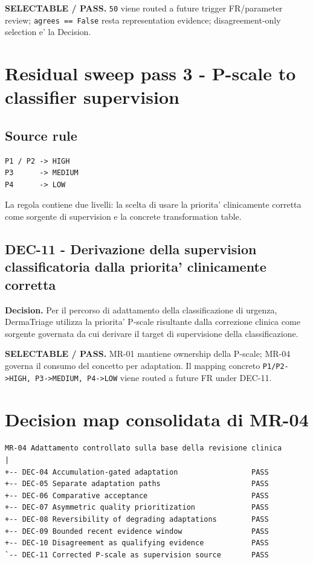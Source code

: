 \documentclass[11pt,a4paper]{article}
\begin{document}
\begin{ddtacore}[title={Disposition}]
\textbf{SELECTABLE / PASS.} \texttt{50} viene routed a future trigger FR/parameter review; \texttt{agrees == False} resta representation evidence; disagreement-only selection e' la Decision.
\end{ddtacore}

\section{Residual sweep pass 3 - P-scale to classifier supervision}
\subsection{Source rule}
\begin{lstlisting}
P1 / P2 -> HIGH
P3      -> MEDIUM
P4      -> LOW
\end{lstlisting}

La regola contiene due livelli: la scelta di usare la priorita' clinicamente corretta come sorgente di supervision e la concrete transformation table.

\subsection{DEC-11 - Derivazione della supervision classificatoria dalla priorita' clinicamente corretta}
\textbf{Decision.} Per il percorso di adattamento della classificazione di urgenza, DermaTriage utilizza la priorita' P-scale risultante dalla correzione clinica come sorgente governata da cui derivare il target di supervisione della classificazione.

\begin{ddtacore}[title={Disposition}]
\textbf{SELECTABLE / PASS.} MR-01 mantiene ownership della P-scale; MR-04 governa il consumo del concetto per adaptation. Il mapping concreto \texttt{P1/P2->HIGH, P3->MEDIUM, P4->LOW} viene routed a future FR under DEC-11.
\end{ddtacore}

\section{Decision map consolidata di MR-04}
\begin{lstlisting}
MR-04 Adattamento controllato sulla base della revisione clinica
|
+-- DEC-04 Accumulation-gated adaptation                 PASS
+-- DEC-05 Separate adaptation paths                     PASS
+-- DEC-06 Comparative acceptance                        PASS
+-- DEC-07 Asymmetric quality prioritization             PASS
+-- DEC-08 Reversibility of degrading adaptations        PASS
+-- DEC-09 Bounded recent evidence window                PASS
+-- DEC-10 Disagreement as qualifying evidence           PASS
`-- DEC-11 Corrected P-scale as supervision source       PASS
\end{lstlisting}
\end{document}
